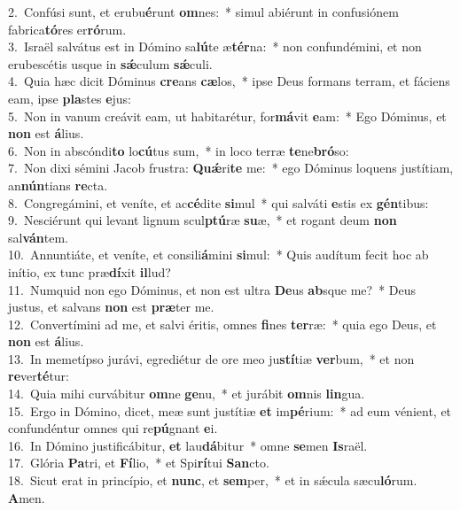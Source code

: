 {2.~}Confúsi sunt, et erubu\textbf{é}runt \textbf{om}nes:~* simul abiérunt in confusiónem fabrica\textbf{tó}res er\textbf{ró}rum.\\
{3.~}Israël salvátus est in Dómino sa\textbf{lú}te æ\textbf{tér}na:~* non confundémini, et non erubescétis usque in \textbf{sǽ}culum \textbf{sǽ}culi.\\
{4.~}Quia hæc dicit Dóminus \textbf{cre}ans \textbf{cæ}los,~* ipse Deus formans terram, et fáciens eam, ipse \textbf{pla}stes \textbf{e}jus:\\
{5.~}Non in vanum creávit eam, ut habitarétur, for\textbf{má}vit \textbf{e}am:~* Ego Dóminus, et \textbf{non} est \textbf{á}lius.\\
{6.~}Non in abscóndi\textbf{to} lo\textbf{cú}tus sum,~* in loco terræ \textbf{te}ne\textbf{bró}so:\\
{7.~}Non dixi sémini Jacob frustra: \textbf{Quǽ}ri\textbf{te} me:~* ego Dóminus loquens justítiam, an\textbf{nún}tians \textbf{re}cta.\\
{8.~}Congregámini, et veníte, et ac\textbf{cé}dite \textbf{si}mul~* qui salváti \textbf{e}stis ex \textbf{gén}tibus:\\
{9.~}Nesciérunt qui levant lignum scul\textbf{ptú}ræ \textbf{su}æ,~* et rogant deum \textbf{non} sal\textbf{ván}tem.\\
{10.~}Annuntiáte, et veníte, et consili\textbf{á}mini \textbf{si}mul:~* Quis audítum fecit hoc ab inítio, ex tunc præ\textbf{dí}xit \textbf{il}lud?\\
{11.~}Numquid non ego Dóminus, et non est ultra \textbf{De}us \textbf{ab}sque me?~* Deus justus, et salvans \textbf{non} est \textbf{præ}ter me.\\
{12.~}Convertímini ad me, et salvi éritis, omnes \textbf{fi}nes \textbf{ter}ræ:~* quia ego Deus, et \textbf{non} est \textbf{á}lius.\\
{13.~}In memetípso jurávi, egrediétur de ore meo ju\textbf{stí}tiæ \textbf{ver}bum,~* et non \textbf{re}ver\textbf{té}tur:\\
{14.~}Quia mihi curvábitur \textbf{om}ne \textbf{ge}nu,~* et jurábit \textbf{om}nis \textbf{lin}gua.\\
{15.~}Ergo in Dómino, dicet, meæ sunt justítiæ \textbf{et} im\textbf{pé}rium:~* ad eum vénient, et confundéntur omnes qui re\textbf{pú}gnant \textbf{e}i.\\
{16.~}In Dómino justificábitur, \textbf{et} lau\textbf{dá}bitur~* omne \textbf{se}men \textbf{Is}raël.\\
{17.~}Glória \textbf{Pa}tri, et \textbf{Fí}lio,~* et Spi\textbf{rí}tui \textbf{San}cto.\\
{18.~}Sicut erat in princípio, et \textbf{nunc}, et \textbf{sem}per,~* et in sǽcula sæcu\textbf{ló}rum. \textbf{A}men.\\
